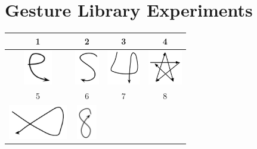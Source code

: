 


\section{Gesture Library Experiments}
\label{sec:GestureLibrary}

\begin{table}

\begin{center}
  \begin{tabular}{ c | c | c | c  }
    \hline
    1 & 2 & 3 & 4  \\ \hline
    \includegraphics[width=0.2\linewidth, height=15mm]{./figures/gesture_e.png} & 
    \includegraphics[width=0.2\linewidth, height=15mm]{./figures/gesture_s.png} &
    \includegraphics[width=0.2\linewidth, height=15mm]{./figures/gesture_num4.png} &
    \includegraphics[width=0.2\linewidth, height=15mm]{./figures/gesture_star.png}  \\ \hline
    5 & 6 & 7 & 8 	 \\ \hline
    \includegraphics[width=0.2\linewidth, height=15mm]{./figures/gesture_5.png} &
    \includegraphics[width=0.2\linewidth, height=15mm]{./figures/gesture_num8.png} &

\end{tabular}
\end{center}
\end{table}
